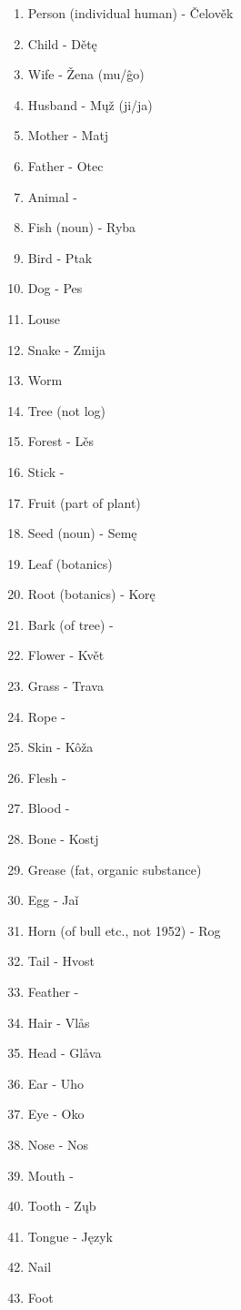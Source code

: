 \begin{multicols}{2}
\begin{enumerate}
	\item Person (individual human) - Čelověk
	\item Child - Dětę
	\item Wife - Žena (mu/ĝo)
	\item Husband - Mųž (ji/ja)
	\item Mother - Matj
	\item Father - Otec
	\item Animal - 
	\item Fish (noun) - Ryba
	\item Bird - Ptak
	\item Dog - Pes
	\item Louse
	\item Snake - Zmija
	\item Worm
	\item Tree (not log)
	\item Forest - Lěs
	\item Stick - 
	\item Fruit (part of plant)
	\item Seed (noun) - Semę
	\item Leaf (botanics)
	\item Root (botanics) - Korę
	\item Bark (of tree) -
	\item Flower - Květ
	\item Grass - Trava
	\item Rope - 
	\item Skin - Kôža
	\item Flesh - 
	\item Blood - 
	\item Bone - Kostj
	\item Grease (fat, organic substance)
	\item Egg - Jaǐ
	\item Horn (of bull etc., not 1952) - Rog
	\item Tail - Hvost
	\item Feather - 
	\item Hair - Vlås
	\item Head - Glåva
	\item Ear - Uho
	\item Eye - Oko
	\item Nose - Nos
	\item Mouth - 
	\item Tooth - Zųb
	\item Tongue - Język
	\item Nail
	\item Foot

\end{enumerate}
\end{multicols}
